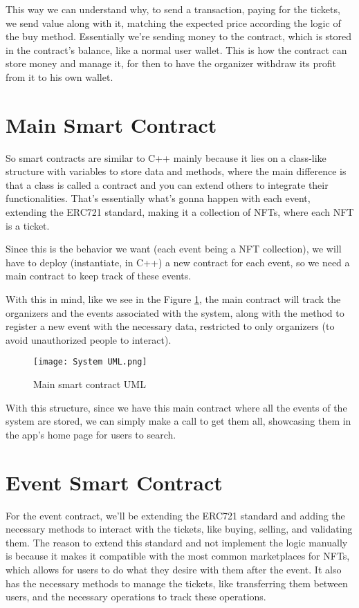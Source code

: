 This way we can understand why, to send a transaction, paying for the tickets, we send value along with it, matching the expected price according the logic of the buy method. Essentially we're sending money to the contract, which is stored in the contract's balance, like a normal user wallet. This is how the contract can store money and manage it, for then to have the organizer withdraw its profit from it to his own wallet.

\section{Main Smart Contract}
\label{sec:main_smart_contract}

So smart contracts are similar to C++ mainly because it lies on a class-like structure with variables to store data and methods, where the main difference is that a class is called a contract and you can extend others to integrate their functionalities. That's essentially what's gonna happen with each event, extending the ERC721 standard, making it a collection of NFTs, where each NFT is a ticket.

Since this is the behavior we want (each event being a NFT collection), we will have to deploy (instantiate, in C++) a new contract for each event, so we need a main contract to keep track of these events.

With this in mind, like we see in the Figure \ref{fig:system_uml}, the main contract will track the organizers and the events associated with the system, along with the method to register a new event with the necessary data, restricted to only organizers (to avoid unauthorized people to interact).

\begin{figure}[H]
    \texttt{[image: System UML.png]}
    \centering
    \caption{Main smart contract UML}
    \label{fig:system_uml}
\end{figure}

With this structure, since we have this main contract where all the events of the system are stored, we can simply make a call to get them all, showcasing them in the app's home page for users to search.

\section{Event Smart Contract}
\label{sec:event_smart_contract}

For the event contract, we'll be extending the ERC721 standard and adding the necessary methods to interact with the tickets, like buying, selling, and validating them. The reason to extend this standard and not implement the logic manually is because it makes it compatible with the most common marketplaces for NFTs, which allows for users to do what they desire with them after the event. It also has the necessary methods to manage the tickets, like transferring them between users, and the necessary operations to track these operations.

